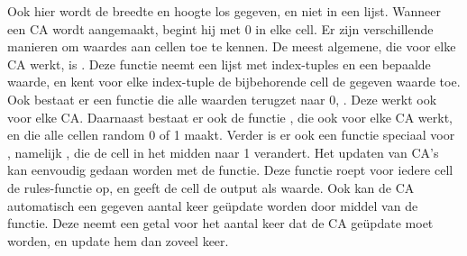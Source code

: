 {}\markdownRendererInterblockSeparator
{}Ook hier wordt de breedte en hoogte los gegeven, en niet in een lijst.\markdownRendererInterblockSeparator
{}\markdownRendererInterblockSeparator
{}Wanneer een CA wordt aangemaakt, begint hij met 0 in elke cell. Er zijn verschillende manieren om waardes aan cellen toe te kennen.\markdownRendererInterblockSeparator
{}De meest algemene, die voor elke CA werkt, is . Deze functie neemt een lijst met index-tuples en een bepaalde waarde, en kent voor elke index-tuple de bijbehorende cell de gegeven waarde toe.\markdownRendererInterblockSeparator
{}\markdownRendererInterblockSeparator
{}Ook bestaat er een functie die alle waarden terugzet naar 0, . Deze werkt ook voor elke CA.\markdownRendererInterblockSeparator
{}\markdownRendererInterblockSeparator
{}Daarnaast bestaat er ook de functie , die ook voor elke CA werkt, en die alle cellen random 0 of 1 maakt.\markdownRendererInterblockSeparator
{}\markdownRendererInterblockSeparator
{}Verder is er ook een functie speciaal voor , namelijk , die de cell in het midden naar 1 verandert.\markdownRendererInterblockSeparator
{}\markdownRendererInterblockSeparator
{}\markdownRendererInterblockSeparator
{}Het updaten van CA's kan eenvoudig gedaan worden met de  functie. Deze functie roept voor iedere cell de rules-functie op, en geeft de cell de output als waarde.\markdownRendererInterblockSeparator
{}\markdownRendererInterblockSeparator
{}Ook kan de CA automatisch een gegeven aantal keer geüpdate worden door middel van de  functie. Deze neemt een getal voor het aantal keer dat de CA geüpdate moet worden, en update hem dan zoveel keer.\markdownRendererInterblockSeparator
